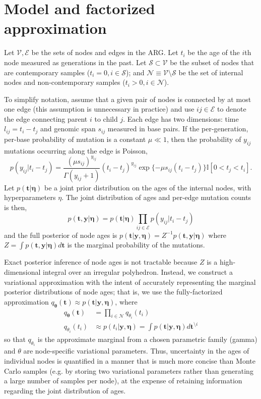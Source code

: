 \documentclass{article}
\begin{document}
\section{Model and factorized approximation}

Let $\mathcal{V}, \mathcal{E}$ be the sets of nodes and edges in the ARG. 
Let $t_i$ be the age of the $i$th node measured as generations in the past. 
Let $\mathcal{S} \subset \mathcal{V}$ be the subset of nodes that are contemporary samples ($t_i = 0, i \in \mathcal{S}$); 
and $\mathcal{N} \equiv \mathcal{V} \setminus \mathcal{S}$ be the set of internal nodes and non-contemporary samples ($t_i > 0, i \in \mathcal{N}$). 

To simplify notation, assume that a given pair of nodes is connected by at most one edge 
(this assumption is unnecessary in practice) 
and use $ij \in \mathcal{E}$ to denote the edge connecting parent $i$ to child $j$. 
Each edge has two dimensions: time $l_{ij} = t_i - t_j$ and genomic span $s_{ij}$ measured in base pairs. 
If the per-generation, per-base probability of mutation is a constant $\mu \ll 1$, 
then the probability of $y_{ij}$ mutations occurring along the edge is Poisson, 
\[
  p(y_{ij} | t_{i} - t_{j}) = \frac{(\mu s_{ij})^{y_{ij}}}{\Gamma(y_{ij} + 1)} (t_i - t_j)^{y_{ij}} \exp\{-\mu s_{ij} (t_i - t_j)\} \mathbb{I}[0 < t_j < t_i]. 
\]
Let $p(\bm t | \bm \eta)$ be a joint prior distribution on the ages of the internal nodes, 
with hyperparameters $\eta$. 
The joint distribution of ages and per-edge mutation counts is then,
\[
  p(\bm t, \bm y | \bm \eta) = p(\bm t | \bm \eta) \prod_{ij \in \mathcal{E}} p(y_{ij} | t_i - t_j)
\]
and the full posterior of node ages is 
$p(\bm t | \bm y, \bm \eta) = Z^{-1} p(\bm t, \bm y | \bm \eta)$ 
where $Z = \int p(\bm t, \bm y | \bm \eta) d\bm t$ is the marginal probability of the mutations.

Exact posterior inference of node ages is not tractable because $Z$ is a high-dimensional integral over an irregular polyhedron. 
Instead, we construct a variational approximation with the intent of accurately representing the marginal posterior distributions of node ages; 
that is, we use the fully-factorized approximation $q_{\bm \theta}(\bm t) \approx p(\bm t | \bm y, \bm \eta)$, where
\[
\begin{aligned}
q_{\bm \theta}(\bm t) & = \prod_{i \in \mathcal{N}} q_{\theta_i}(t_i) \\
q_{\theta_i}(t_i) & \approx p(t_i | \bm y, \bm \eta) = \int p(\bm t | \bm y, \bm \eta) d\bm t^{\setminus i}
\end{aligned}
\]
so that $q_{\theta_i}$ is the approximate marginal from a chosen parametric family (gamma) and $\theta$ are node-specific variational parameters. 
Thus, uncertainty in the ages of individual nodes is quantified in a manner that is much more concise than Monte Carlo samples 
(e.g. by storing two variational parameters rather than generating a large number of samples per node), 
at the expense of retaining information regarding the joint distribution of ages.
\end{document}
